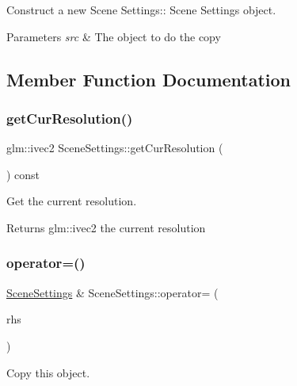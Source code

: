 Construct a new Scene Settings\+:\+: Scene Settings object. 


\begin{DoxyParams}{Parameters}
{\em src} & The object to do the copy \\
\hline
\end{DoxyParams}


\subsection{Member Function Documentation}
\mbox{\label{class_scene_settings_a590dc1227ae74a8af7a3f3cb0ccc45fd}} 
\subsubsection{\texorpdfstring{get\+Cur\+Resolution()}{getCurResolution()}}
{\footnotesize\ttfamily glm\+::ivec2 Scene\+Settings\+::get\+Cur\+Resolution (\begin{DoxyParamCaption}{ }\end{DoxyParamCaption}) const}



Get the current resolution. 

\begin{DoxyReturn}{Returns}
glm\+::ivec2 the current resolution 
\end{DoxyReturn}
\mbox{\label{class_scene_settings_ad650f1a581258755fae7b25fee8ddc3f}} 
\subsubsection{\texorpdfstring{operator=()}{operator=()}}
{\footnotesize\ttfamily \hyperlink{class_scene_settings}{Scene\+Settings} \& Scene\+Settings\+::operator= (\begin{DoxyParamCaption}\item[{\hyperlink{class_scene_settings}{Scene\+Settings} const \&}]{rhs }\end{DoxyParamCaption})}



Copy this object. 


